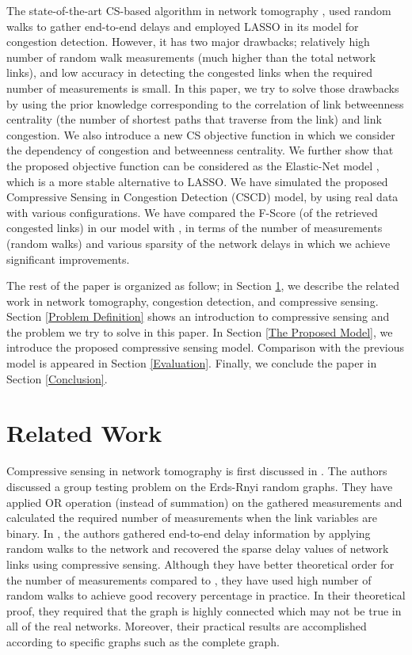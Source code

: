 \documentclass{article}
\begin{document}
The state-of-the-art CS-based algorithm in network tomography \cite{CSoverGraph}, used random walks to gather end-to-end delays and employed LASSO in its model for congestion detection.  However, it has two major drawbacks; relatively high number of random walk measurements (much higher than the total network links), and low accuracy in detecting the congested links when the required number of measurements is small. 
In this paper, we try to solve those drawbacks by using the prior knowledge corresponding to the correlation of link betweenness centrality (the number of shortest paths that traverse from the link) and link congestion. We also introduce a new CS objective function in which we consider the dependency of congestion and betweenness centrality. We further show that the proposed objective function can be considered as the Elastic-Net model \cite{ENet}, which is a more stable alternative to LASSO.
We have simulated the proposed Compressive Sensing in Congestion Detection (CSCD) model, by using real data with various configurations. We have compared the F-Score (of the retrieved congested links) in our model with \cite{CSoverGraph}, in terms of the number of measurements (random walks) and various sparsity of the network delays in which we achieve significant improvements. 

The rest of the paper is organized as follow; in Section \ref{Related Work}, we describe the related work in network tomography, congestion detection, and compressive sensing. Section \ref{Problem Definition} shows an introduction to compressive sensing and the problem we try to solve in this paper. In Section \ref{The Proposed Model}, we introduce the proposed compressive sensing model. Comparison with the previous model is appeared in Section \ref{Evaluation}. Finally, we conclude the paper in Section \ref{Conclusion}. 
\section{Related Work}
\label{Related Work}
Compressive sensing in network tomography is first discussed in \cite{GroupTest1}. The authors discussed a group testing problem on the Erds-Rnyi random graphs. They have applied OR operation (instead of summation) on the gathered measurements and calculated the required number of measurements when the link variables are binary. In \cite{CSoverGraph}, the authors gathered end-to-end delay information by applying random walks to the network and recovered the sparse delay values of network links using compressive sensing. Although they have better theoretical order for the number of measurements compared to \cite{GroupTest1}, they have used high number of random walks to achieve good recovery percentage in practice. In their theoretical proof, they required that the graph is highly connected which may not be true in all of the real networks. Moreover, their practical results are accomplished according to specific graphs such as the complete graph.
\end{document}
